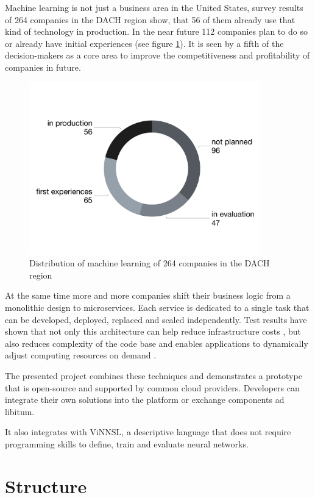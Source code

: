 Machine learning is not just a business area in the United States,
survey results of 264 companies in the DACH region show, that 56 of them
already use that kind of technology in production. In the near future
112 companies plan to do so or already have initial experiences (see
figure \ref{img.crisp_ml_verbreitung}). It is seen by a fifth of the
decision-makers as a core area to improve the competitiveness and
profitability of companies in future. \cite{crisp}

\begin{figure}
\centering
\includegraphics[width=10.00000cm]{images/crisp_ml_verbreitung}
\caption{Distribution of machine learning of 264 companies in the DACH
region \cite{crisp}\label{img.crisp_ml_verbreitung}}
\end{figure}

At the same time more and more companies shift their business logic from
a monolithic design to microservices. Each service is dedicated to a
single task that can be developed, deployed, replaced and scaled
independently. Test results have shown that not only this architecture
can help reduce infrastructure costs
\cite{villamizar2}\cite{villamizar}, but also reduces complexity of the
code base and enables applications to dynamically adjust computing
resources on demand \cite{villamizar}.

The presented project combines these techniques and demonstrates a
prototype that is open-source and supported by common cloud providers.
Developers can integrate their own solutions into the platform or
exchange components ad libitum.

It also integrates with ViNNSL, a descriptive language that does not
require programming skills to define, train and evaluate neural
networks.

\section{Structure}\label{structure}


